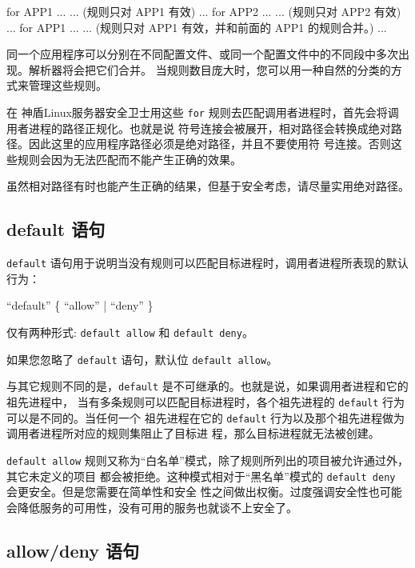 \documentclass[CJK, 12pt, hyperref, bookmark]{z-article}
\newcommand\code[1]{\texttt{#1}}
\newcommand\syntax[1]{
  \begin{mdframed}[
      linecolor=brown,
      linewidth=2pt,
    ]
    #1
  \end{mdframed}
}
\newcommand\sdef{神盾Linux服务器安全卫士}
\begin{document}
    \begin{codeblk}
      for APP1
      ...
      ... (规则只对 APP1 有效)
      ...
      for APP2
      ...
      ... (规则只对 APP2 有效)
      ...
      for APP1
      ...
      ... (规则只对 APP1 有效，并和前面的 APP1 的规则合并。)
      ...
    \end{codeblk}

    同一个应用程序可以分别在不同配置文件、或同一个配置文件中的不同段中多次出现。解析器将会把它们合并。
    当规则数目庞大时，您可以用一种自然的分类的方式来管理这些规则。

    在 \sdef 用这些 \code{for} 规则去匹配调用者进程时，首先会将调用者进程的路径正规化。也就是说
    符号连接会被展开，相对路径会转换成绝对路径。因此这里的应用程序路径必须是绝对路径，并且不要使用符
    号连接。否则这些规则会因为无法匹配而不能产生正确的效果。
    
    虽然相对路径有时也能产生正确的结果，但基于安全考虑，请尽量实用绝对路径。
    
    \subsection {default 语句}

    \code{default} 语句用于说明当没有规则可以匹配目标进程时，调用者进程所表现的默认行为：

    \syntax {
      ``default'' \{ ``allow'' | ``deny'' \}
    }

    仅有两种形式: \code{default allow} 和 \code{default deny}。

    如果您忽略了 \code{default} 语句，默认位 \code{default allow}。

    与其它规则不同的是，\code{default} 是不可继承的。也就是说，如果调用者进程和它的祖先进程中，
    当有多条规则可以匹配目标进程时，各个祖先进程的 \code{default} 行为可以是不同的。当任何一个
    祖先进程在它的 \code{default} 行为以及那个祖先进程做为调用者进程所对应的规则集阻止了目标进
    程，那么目标进程就无法被创建。

    \code{default allow} 规则又称为“白名单”模式，除了规则所列出的项目被允许通过外，其它未定义的项目
    都会被拒绝。这种模式相对于“黑名单”模式的 \code{default deny} 会更安全。但是您需要在简单性和安全
    性之间做出权衡。过度强调安全性也可能会降低服务的可用性，没有可用的服务也就谈不上安全了。
    
    \subsection {allow/deny 语句}
\end{document}
